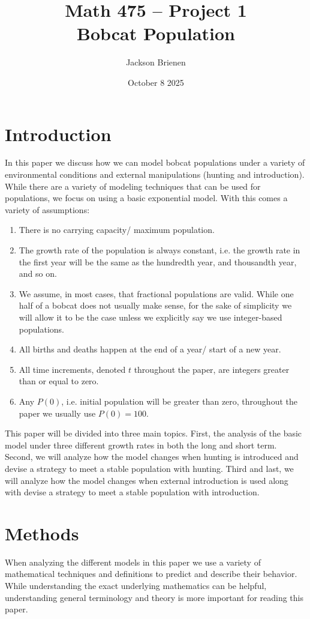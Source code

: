 \documentclass{article}
\title{Math 475 -- Project 1 \\ Bobcat Population}
\author{Jackson Brienen}
\date{October 8 2025}
\begin{document}
\maketitle

\section{Introduction}
In this paper we discuss how we can model bobcat populations under a variety of environmental conditions and external manipulations (hunting and introduction). While there are a variety of modeling techniques that can be used for populations, we focus on using a basic exponential model. With this comes a variety of assumptions:

\begin{enumerate}
    \item There is no carrying capacity/ maximum population.
    \item The growth rate of the population is always constant, i.e. the growth rate in the first year will be the same as the hundredth year, and thousandth year, and so on.
    \item We assume, in most cases, that fractional populations are valid. While one half of a bobcat does not usually make sense, for the sake of simplicity we will allow it to be the case unless we explicitly say we use integer-based populations.
    \item All births and deaths happen at the end of a year/ start of a new year.
    \item All time increments, denoted $t$ throughout the paper, are integers greater than or equal to zero.
    \item Any $P(0)$, i.e. initial population will be greater than zero, throughout the paper we usually use $P(0)=100$.
\end{enumerate}

This paper will be divided into three main topics. First, the analysis of the basic model under three different growth rates in both the long and short term. Second, we will analyze how the model changes when hunting is introduced and devise a strategy to meet a stable population with hunting. Third and last, we will analyze how the model changes when external introduction is used along with devise a strategy to meet a stable population with introduction.

\section{Methods}
When analyzing the different models in this paper we use a variety of mathematical techniques and definitions to predict and describe their behavior. While understanding the exact underlying mathematics can be helpful, understanding general terminology and theory is more important for reading this paper.
\end{document}
